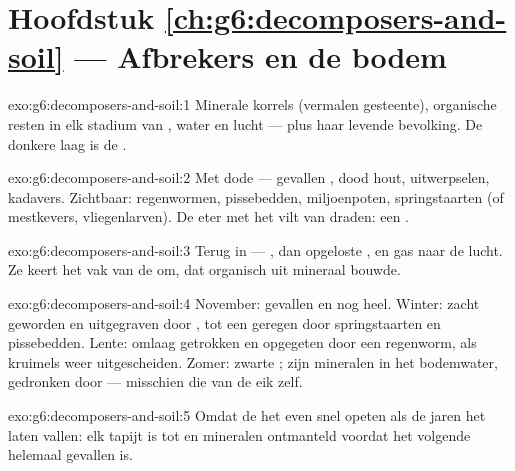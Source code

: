 \section*{Hoofdstuk \ref{ch:g6:decomposers-and-soil} --- Afbrekers en de bodem}

\begin{solution}{exo:g6:decomposers-and-soil:1}
Minerale korrels (vermalen gesteente), organische resten in elk stadium
van , water en lucht --- plus haar levende bevolking. De donkere
laag is de .
\end{solution}

\begin{solution}{exo:g6:decomposers-and-soil:2}
Met dode  --- gevallen , dood hout,
uitwerpselen, kadavers. Zichtbaar: regenwormen, pissebedden,
miljoenpoten, springstaarten (of mestkevers, vliegenlarven). De eter met
het vilt van draden: een .
\end{solution}

\begin{solution}{exo:g6:decomposers-and-soil:3}
Terug in  --- , dan opgeloste , en
gas naar de lucht. Ze keert het vak van de  om, dat organisch
uit mineraal bouwde.
\end{solution}

\begin{solution}{exo:g6:decomposers-and-soil:4}
November: gevallen en nog heel. Winter: zacht geworden en uitgegraven
door , tot een  geregen door springstaarten en
pissebedden. Lente: omlaag getrokken en opgegeten door een regenworm, als
kruimels weer uitgescheiden. Zomer: zwarte ; zijn mineralen in het
bodemwater, gedronken door  --- misschien die van de eik zelf.
\end{solution}

\begin{solution}{exo:g6:decomposers-and-soil:5}
Omdat de  het even snel opeten als de jaren het laten vallen:
elk tapijt is tot  en mineralen ontmanteld voordat het volgende
helemaal gevallen is.
\end{solution}

